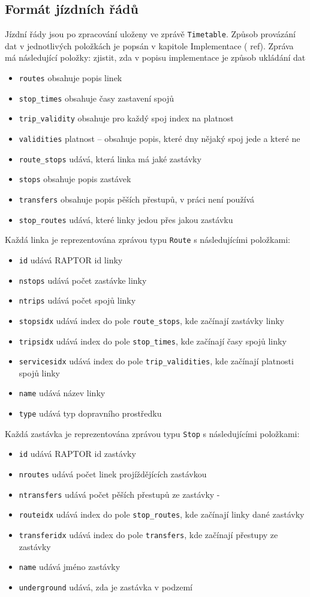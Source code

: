 \subsection{Formát jízdních řádů}
Jízdní řády jsou po zpracování uloženy ve zprávě {\tt Timetable}. Způsob
provázání dat v jednotlivých položkách je popsán v kapitole Implementace (\TODO
ref). Zpráva má následující položky:
\TODO zjistit, zda v popisu implementace je způsob ukládání dat
\begin{itemize}
	\item {\tt routes} obsahuje popis linek
	\item {\tt stop\_times} obsahuje časy zastavení spojů 
	\item {\tt trip\_validity} obsahuje pro každý spoj index na platnost 
	\item {\tt validities} platnost -- obsahuje popis, které dny nějaký spoj
	jede a které ne 
	\item {\tt route\_stops} udává, která linka má jaké zastávky 
	\item {\tt stops} obsahuje popis zastávek
	\item {\tt transfers} obsahuje popis pěších přestupů, v práci není
	používá 
	\item {\tt stop\_routes} udává, které linky jedou přes jakou zastávku
\end{itemize} 
Každá linka je reprezentována zprávou typu {\tt Route} s následujícími
položkami:
\begin{itemize}
	\item {\tt id} udává RAPTOR id linky 
	\item {\tt nstops} udává počet zastávke linky
	\item {\tt ntrips} udává počet spojů linky
	\item {\tt stopsidx} udává index do pole {\tt route\_stops}, kde
	začínají zastávky linky
	\item {\tt tripsidx} udává index do pole {\tt stop\_times}, kde
	začínají časy spojů linky
	\item {\tt servicesidx} udává index do pole {\tt trip\_validities}, kde
	začínají platnosti spojů linky
	\item {\tt name} udává název linky
	\item {\tt type} udává typ dopravního prostředku
\end{itemize}
Každá zastávka je reprezentována zprávou typu {\tt Stop} s následujícími
položkami:
\begin{itemize}
	\item {\tt id} udává RAPTOR id zastávky
	\item {\tt nroutes} udává počet linek projíždějících zastávkou
	\item {\tt ntransfers} udává počet pěších přestupů ze zastávky
	-\item {\tt routeidx} udává index do pole {\tt stop\_routes}, kde
	začínají linky dané zastávky
	\item {\tt transferidx} udává index do pole {\tt transfers}, kde
	začínají přestupy ze zastávky
	\item {\tt name} udává jméno zastávky
	\item {\tt underground} udává, zda je zastávka v podzemí
\end{itemize}
